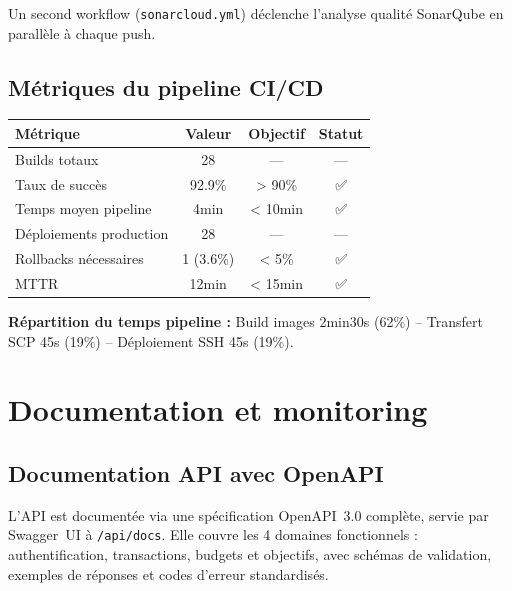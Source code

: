 Un second workflow (\texttt{sonarcloud.yml}) déclenche l'analyse qualité SonarQube en parallèle à chaque push.

\subsection{Métriques du pipeline CI/CD}

\begin{tcolorbox}[colback=blue!5!white,colframe=blue!60!black,title=\textbf{Statistiques CI/CD (Q4 2025)}]
\begin{center}
\begin{tabular}{|l|c|c|c|}
\hline
\textbf{Métrique} & \textbf{Valeur} & \textbf{Objectif} & \textbf{Statut} \\
\hline
Builds totaux & 28 & --- & --- \\
Taux de succès & 92.9\% & > 90\% & ✅ \\
Temps moyen pipeline & 4min & < 10min & ✅ \\
Déploiements production & 28 & --- & --- \\
Rollbacks nécessaires & 1 (3.6\%) & < 5\% & ✅ \\
MTTR & 12min & < 15min & ✅ \\
\hline
\end{tabular}
\end{center}
\textbf{Répartition du temps pipeline :} Build images 2min30s (62\%) -- Transfert SCP 45s (19\%) -- Déploiement SSH 45s (19\%).
\end{tcolorbox}

\section{Documentation et monitoring}

\subsection{Documentation API avec OpenAPI}

L'API est documentée via une spécification OpenAPI~3.0 complète, servie par Swagger~UI à \texttt{/api/docs}. Elle couvre les 4 domaines fonctionnels : authentification, transactions, budgets et objectifs, avec schémas de validation, exemples de réponses et codes d'erreur standardisés.

